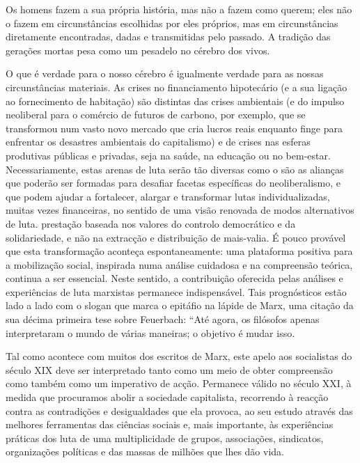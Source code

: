  \par 
Os homens fazem a sua própria história, mas não a fazem como querem; eles não o fazem em circunstâncias escolhidas por eles próprios, mas em circunstâncias diretamente encontradas, dadas e transmitidas pelo passado. A tradição das gerações mortas pesa como um pesadelo no cérebro dos vivos.
 \par 
O que é verdade para o nosso cérebro é igualmente verdade para as nossas circunstâncias materiais. As crises no financiamento hipotecário (e a sua ligação ao fornecimento de habitação) são distintas das crises ambientais (e do impulso neoliberal para o comércio de futuros de carbono, por exemplo, que se transformou num vasto novo mercado que cria lucros reais enquanto finge para enfrentar os desastres ambientais do capitalismo) e de crises nas esferas produtivas públicas e privadas, seja na saúde, na educação ou no bem-estar. Necessariamente, estas arenas de luta serão tão diversas como o são as alianças que poderão ser formadas para desafiar facetas específicas do neoliberalismo, e que podem ajudar a fortalecer, alargar e transformar lutas individualizadas, muitas vezes financeiras, no sentido de uma visão renovada de modos alternativos de luta. prestação baseada nos valores do controlo democrático e da solidariedade, e não na extracção e distribuição de mais-valia. É pouco provável que esta transformação aconteça espontaneamente: uma plataforma positiva para a mobilização social, inspirada numa análise cuidadosa e na compreensão teórica, continua a ser essencial. Neste sentido, a contribuição oferecida pelas análises e experiências de luta marxistas permanece indispensável. Tais prognósticos estão lado a lado com o slogan que marca o epitáfio na lápide de Marx, uma citação da sua décima primeira tese sobre Feuerbach: “Até agora, os filósofos apenas interpretaram o mundo de várias maneiras; o objetivo é mudar isso.
 \par 
Tal como acontece com muitos dos escritos de Marx, este apelo aos socialistas do século XIX deve ser interpretado tanto como um meio de obter compreensão como também como um imperativo de acção. Permanece válido no século XXI, à medida que procuramos abolir a sociedade capitalista, recorrendo à reacção contra as contradições e desigualdades que ela provoca, ao seu estudo através das melhores ferramentas das ciências sociais e, mais importante, às experiências práticas dos luta de uma multiplicidade de grupos, associações, sindicatos, organizações políticas e das massas de milhões que lhes dão vida.
 \par 
